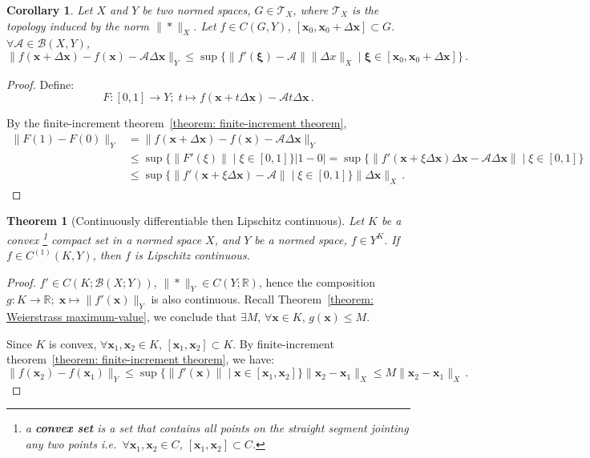 \documentclass[openany]{book}
\newcommand*{\indexbf}[1]{\emph{\textbf{#1}}\index{#1}} %
\theoremstyle{plain}
\newtheorem{theorem}{Theorem}[section] %
\newtheorem{corollary}{Corollary} %
\theoremstyle{definition}
\newcommand*{\bv}{\boldsymbol} %
\begin{document}
\begin{corollary}
	\label{corollary: difference between derivative and any linear operator}
	Let $X$ and $Y$ be two normed spaces, $G \in \mathscr T_X$, where $\mathscr T_X$ is the topology induced by the norm $\|*\|_X$. 
	Let $f \in C(G, Y)$, $[\bv x_0, \bv x_0 + \Delta \bv x] \subset G$.
	$\forall \mathscr A \in \mathcal B(X, Y)$, 
	\begin{equation*}
		\|f(\bv x + \Delta \bv x) - f(\bv x) - \mathscr A \Delta \bv x\|_Y
			\leq \sup \big\{\|f'(\bv \xi) - \mathscr A\| \|\Delta x\|_X 
				\mid \bv \xi \in [\bv x_0, \bv x_0 + \Delta \bv x]\big\}\,.
	\end{equation*}
\end{corollary}
\begin{proof}
	Define:
	\begin{equation*}
		F \colon [0, 1] \to Y; \; 
		t \mapsto f(\bv x + t \Delta \bv x) - \mathscr A t \Delta \bv x\,.
	\end{equation*}

	By the finite-increment theorem~\ref{theorem: finite-increment theorem}, 
	\begin{align*}
		\|F(1) - F(0)\|_Y 
		&= \|f(\bv x + \Delta \bv x) - f(\bv x) - \mathscr A \Delta \bv x\|_Y
		\\
		&\leq \sup\big\{\|F'(\xi)\| \mid \xi \in [0, 1]\big\} |1 - 0|
		= \sup\big\{\|f'(\bv x + \xi \Delta \bv x)\Delta \bv x - \mathscr A \Delta \bv x \| \mid \xi \in [0, 1]\big\}
		\\
		&\leq \sup\big\{\|f'(\bv x + \xi \Delta \bv x) - \mathscr A \| \mid \xi \in [0, 1]\big\} \|\Delta \bv x\|_X\,.
	\end{align*}
\end{proof}

\begin{theorem}[Continuously differentiable then Lipschitz continuous]
	\label{theorem: continuously differentiable then Lipschitz continuous}
	Let $K$ be a convex%
		\footnote{a \indexbf{convex set} is a set that contains all points on the straight segment jointing any two points i.e.\ $\forall \bv x_1, \bv x_2 \in C$, $[\bv x_1, \bv x_2] \subset C$.}
	compact set in a normed space $X$, and $Y$ be a normed space, $f \in Y^K$.
	If $f \in C^{(1)}(K, Y)$, then $f$ is Lipschitz continuous.
\end{theorem}
\begin{proof}
	$f' \in C(K; \mathcal B(X; Y))$, $\|*\|_Y \in C (Y; \mathbb R)$, hence the composition~$g \colon K \to \mathbb R;\; \bv x \mapsto \|f'(\bv x)\|_Y$ is also continuous. 
	Recall Theorem~\ref{theorem: Weierstrass maximum-value}, we conclude that $\exists M$, $\forall \bv x \in K$, $g(\bv x) \leq M$.

	Since $K$ is convex, $\forall \bv x_1, \bv x_2 \in K$, $[\bv x_1, \bv x_2] \subset K$. 
	By finite-increment theorem~\ref{theorem: finite-increment theorem}, we have:
	\begin{equation*}
		\|f(\bv x_2) - f(\bv x_1)\|_Y 
			\leq \sup\big\{\|f'(\bv x)\| \mid \bv x \in [\bv x_1, \bv x_2]\big\} 
				\|\bv x_2 - \bv x_1\|_X
			\leq M  \|\bv x_2 - \bv x_1\|_X \,.
	\end{equation*}
\end{proof}
\end{document}
